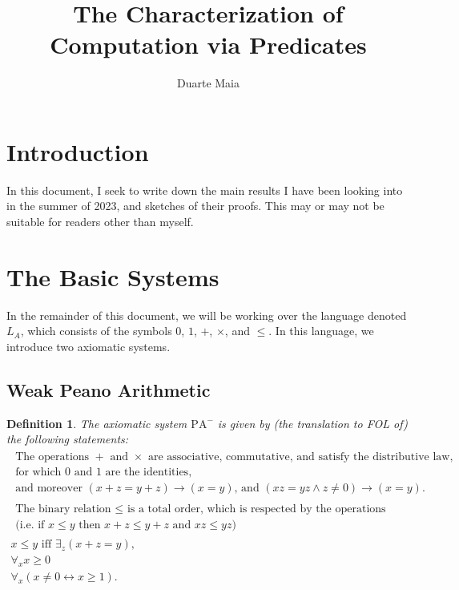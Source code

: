 \documentclass{article}
\title{The Characterization of Computation via Predicates}
\author{Duarte Maia}
\newtheorem{definition}[theorem]{Definition}
\theoremstyle{nonumberplain}
\newcommand{\LA}{L_A}
\newcommand{\PA}{\mathrm{PA}}
\newcommand{\WPA}{\PA^-}
\begin{document}
\maketitle

\tableofcontents

\section{Introduction}

In this document, I seek to write down the main results I have been looking into in the summer of 2023, and sketches of their proofs. This may or may not be suitable for readers other than myself.

\section{The Basic Systems}

In the remainder of this document, we will be working over the language denoted $\LA$, which consists of the symbols $0$, $1$, $+$, $\times$, and $\leq$. In this language, we introduce two axiomatic systems.

\subsection{Weak Peano Arithmetic}

\begin{definition}
The axiomatic system $\WPA$ is given by (the translation to FOL of) the following statements:
\begin{gather}
\begin{gathered}
\text{The operations $+$ and $\times$ are associative, commutative, and satisfy the distributive law,}\\
\text{for which $0$ and $1$ are the identities,}\\
\text{and moreover $(x+z = y+z) \rightarrow (x=y)$, and $(xz = yz \land z \neq 0) \rightarrow (x=y)$.}
\end{gathered} \tag{SRing}\label{ax:sring} \\
\begin{gathered}
\text{The binary relation $\leq$ is a total order, which is respected by the operations}\\
\text{(i.e. if $x \leq y$ then $x+z \leq y+z$ and $xz \leq yz$)}
\end{gathered} \tag{Ord}\label{ax:ord}\\
\text{$x \leq y$ iff $\exists_z (x+z = y)$,} \tag{Def$\leq$}\label{ax:defleq}\\
\forall_x x \geq 0 \tag{ZMin}\label{ax:zmin}\\
\forall_x (x \neq 0 \leftrightarrow x \geq 1). \tag{Disc}\label{ax:disc}
\end{gather}
\end{definition}
\end{document}
